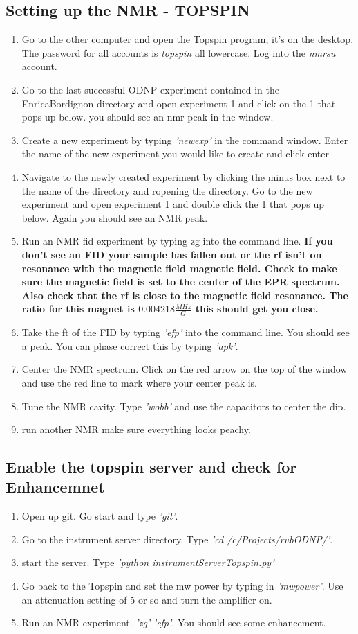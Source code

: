 \documentclass{article}
\newcommand{\fc}[1]{{\color{blue}\textit{'{#1}'}}}
\begin{document}
\subsection{Setting up the NMR - TOPSPIN}
\begin{enumerate}
    \item Go to the other computer and open the Topspin program, it's on the desktop. The password for all accounts is \textit{topspin} all lowercase. Log into the \textit{nmrsu} account.
    \item Go to the last successful ODNP experiment contained in the EnricaBordignon directory and open experiment 1 and click on the 1 that pops up below. you should see an nmr peak in the window.
    \item Create a new experiment by typing \fc{newexp} in the command window. Enter the name of the new experiment you would like to create and click enter
    \item Navigate to the newly created experiment by clicking the minus box next to the name of the directory and ropening the directory. Go to the new experiment and open experiment 1 and double click the 1 that pops up below. Again you should see an NMR peak.
    \item Run an NMR fid experiment by typing zg into the command line. \bf{If you don't see an FID your sample has fallen out or the rf isn't on resonance with the magnetic field magnetic field. Check to make sure the magnetic field is set to the center of the EPR spectrum. Also check that the rf is close to the magnetic field resonance. The ratio for this magnet is $0.004218 \frac{MHz}{G}$ this should get you close.}
    \item Take the ft of the FID by typing \fc{efp} into the command line. You should see a peak. You can phase correct this by typing \fc{apk}.
    \item Center the NMR spectrum. Click on the red arrow on the top of the window and use the red line to mark where your center peak is.
    \item Tune the NMR cavity. Type \fc{wobb} and use the capacitors to center the dip.
    \item run another NMR make sure everything looks peachy.
\end{enumerate}
\subsection{Enable the topspin server and check for Enhancemnet}
\begin{enumerate}
    \item Open up git. Go start and type \fc{git}. 
    \item Go to the instrument server directory. Type \fc{cd /c/Projects/rubODNP/}.
    \item start the server. Type \fc{python instrumentServerTopspin.py}
    \item Go back to the Topspin and set the mw power by typing in \fc{mwpower}. Use an attenuation setting of 5 or so and turn the amplifier on.
    \item Run an NMR experiment. \fc{zg} \fc{efp}. You should see some enhancement.
\end{enumerate}
\end{document}
